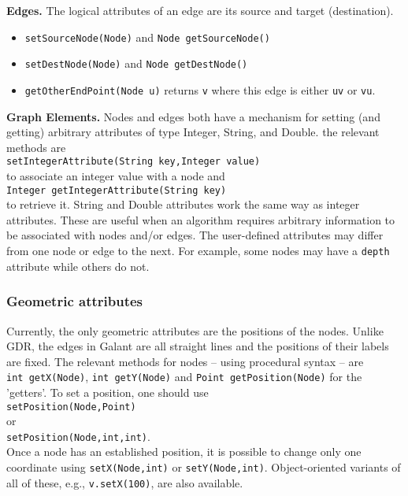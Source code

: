 \bigskip
\textbf{Edges.}
The logical attributes of an edge are its source and target (destination).

\begin{itemize}
\item
\texttt{setSourceNode(Node)} and \texttt{Node~getSourceNode()}
\item
\texttt{setDestNode(Node)} and \texttt{Node~getDestNode()}
\item
\texttt{getOtherEndPoint(Node~u)} returns \texttt{v} where this edge is
either \texttt{uv} or \texttt{vu}.
\end{itemize}

\bigskip
\textbf{Graph Elements.}
Nodes and edges both have a mechanism for setting (and getting)
arbitrary attributes of type Integer, String, and Double.
the relevant methods are\\
\texttt{setIntegerAttribute(String~key,Integer~value)}\\ 
to associate an integer value with a node and\\
\texttt{Integer~getIntegerAttribute(String~key)}\\
to retrieve it.
String and Double attributes work the same way as integer attributes.
These are useful when an algorithm requires arbitrary information to be
associated with nodes and/or edges.
The user-defined attributes may differ from one node or edge to the next.
For example, some nodes may have a \texttt{depth} attribute while others do not.

\subsubsection{Geometric attributes}

Currently, the only geometric attributes are the positions of the
nodes. 
Unlike GDR, the edges in Galant
are all straight lines and the positions of their labels are fixed.
The relevant methods for nodes -- using procedural syntax -- are
\texttt{int~getX(Node)}, \texttt{int~getY(Node)}
and \texttt{Point~getPosition(Node)}
for the 'getters'. To set a position,
one should use\\
\hspace*{2em}\texttt{setPosition(Node,Point)}\\
or\\
\hspace*{2em}\texttt{setPosition(Node,int,int)}.\\
Once a node has an established position, it is possible to change
only one coordinate using \texttt{setX(Node,int)} or \texttt{setY(Node,int)}.
Object-oriented variants of all of these, e.g.,
\texttt{v.setX(100)}, are also available.

